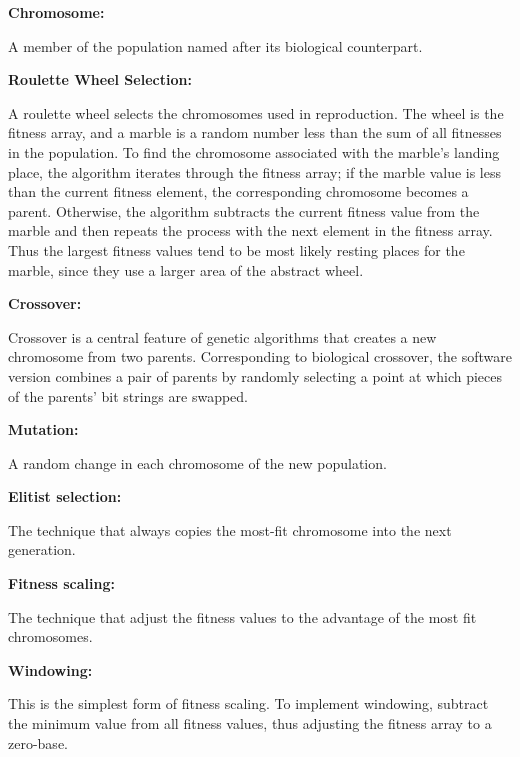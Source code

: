 \documentclass[11pt]{article}
\begin{document}
\vspace{5mm}
\noindent
\textbf{Chromosome:}

	A member of the population named after its biological
counterpart.

\vspace{5mm}
\noindent
\textbf{Roulette Wheel Selection:}

	A roulette wheel selects the chromosomes used in
reproduction. The wheel is the fitness array, and a marble is a random
number less than the sum of all fitnesses in the population. To find
the chromosome associated with the marble's landing place, the
algorithm iterates through the fitness array; if the marble value is
less than the current fitness element, the corresponding chromosome
becomes a parent. Otherwise, the algorithm subtracts the current
fitness value from the marble and then repeats the process with the
next element in the fitness array. Thus the largest fitness values tend
to be most likely resting places for the marble, since they use a
larger area of the abstract wheel.

\vspace{5mm}
\noindent
\textbf{Crossover:}

	Crossover is a central feature of genetic algorithms that
creates a new chromosome from two parents. Corresponding to biological
crossover, the software version combines a pair of parents by randomly
selecting a point at which pieces of the parents' bit strings are
swapped.

\vspace{5mm}
\noindent
\textbf{Mutation:}

	A random change in each chromosome of the new population.

\vspace{5mm}
\noindent
\textbf{Elitist selection:}

	The technique that always copies the most-fit chromosome into
the next generation.

\vspace{5mm}
\noindent
\textbf{Fitness scaling:}

	The technique that adjust the fitness values to the advantage
of the most fit chromosomes.

\vspace{5mm}
\noindent
\textbf{Windowing:}

	This is the simplest form of fitness scaling. To implement
windowing, subtract the minimum value from all fitness values, thus
adjusting the fitness array to a zero-base.
\end{document}

